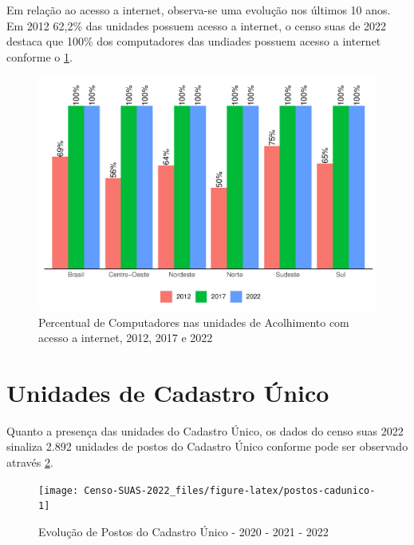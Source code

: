 \documentclass[
  brazilian]{report}
\begin{document}
Em relação ao acesso a internet, observa-se uma evolução nos últimos 10
anos. Em 2012 62,2\% das unidades possuem acesso a internet, o censo
suas de 2022 destaca que 100\% dos computadores das undiades possuem
acesso a internet conforme o \cref{fig:unac-internet}.

\begin{figure}
\includegraphics{Censo-SUAS-2022_files/figure-latex/unac-internet-1} \caption[Percentual de Computadores nas unidades de Acolhimento com acesso a internet, 2012, 2017 e 2022]{Percentual de Computadores nas unidades de Acolhimento com acesso a internet, 2012, 2017 e 2022}\label{fig:unac-internet}
\end{figure}

\hypertarget{unidades-de-cadastro-uxfanico}{%
\section{Unidades de Cadastro
Único}\label{unidades-de-cadastro-uxfanico}}

Quanto a presença das unidades do Cadastro Único, os dados do censo suas
2022 sinaliza 2.892 unidades de postos do Cadastro Único conforme pode
ser observado através \cref{fig:postos-cadunico}.

\begin{figure}
\texttt{[image: Censo-SUAS-2022\_files/figure-latex/postos-cadunico-1]} \caption[Evolução de Postos do Cadastro Único - 2020 - 2021 - 2022]{Evolução de Postos do Cadastro Único - 2020 - 2021 - 2022}\label{fig:postos-cadunico}
\end{figure}
\end{document}
